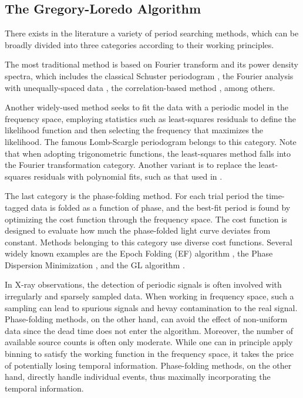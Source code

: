 \documentclass[fleqn,usenatbib]{mnras}
\begin{document}
\subsection{The Gregory-Loredo Algorithm} \label{subsec:GL}
There exists in the literature a variety of period searching methods, which can be broadly divided into three categories according to their working principles. 

The most traditional method is based on Fourier transform and its power density spectra, which includes the classical Schuster periodogram \citep{1898TeMag...3...13S}, the Fourier analysis with unequally-spaced data \citep{1975Ap&SS..36..137D}, the correlation-based method \citep{1988ApJ...333..646E}, among others.

Another widely-used method seeks to fit the data with a periodic model in the frequency space, employing statistics such as least-squares residuals to define the likelihood function and then selecting the frequency that maximizes the likelihood. The famous Lomb-Scargle periodogram \citep[hereafter LS]{1976Ap&SS..39..447L,1982ApJ...263..835S} belongs to this category. Note that when adopting trigonometric functions, the least-squares method falls into the Fourier transformation category. Another variant is to replace the least-squares residuals with polynomial fits, such as that used in \citet{1996ApJ...460L.107S}.

The last category is the phase-folding method. For each trial period the time-tagged data is folded as a function of phase, and the best-fit period is found by optimizing the cost function through the frequency space. The cost function is designed to evaluate how much the phase-folded light curve deviates from constant.
Methods belonging to this category use diverse cost functions. Several widely known examples are the Epoch Folding (EF) algorithm \citep{1983ApJ...266..160L}, the Phase Dispersion Minimization \citep{1978ApJ...224..953S}, and the GL algorithm \citep{1992ApJ...398..146G}.

In X-ray observations, the detection of periodic signals is often involved with irregularly and sparsely sampled data. 
When working in frequency space, such a sampling can lead to spurious signals and hevay contamination to the real signal. Phase-folding methods, on the other hand, can avoid the effect of non-uniform data since the dead time does not enter the algorithm.  
Moreover, the number of available source counts is often only moderate. While one can in principle apply binning to satisfy the working function in the frequency space, it takes the price of potentially losing temporal information.  
Phase-folding methods, on the other hand, directly handle individual events, thus maximally incorporating the temporal information.
\end{document}
